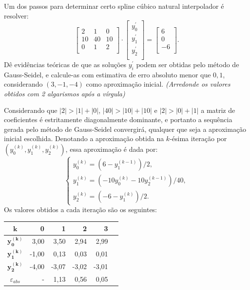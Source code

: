\documentclass[12pt,a4paper]{article}
\begin{document}
\begin{ExerciseList}
\Exercise[title={2,0}] Um dos passos para determinar certo spline cúbico natural interpolador é resolver:
\[
  \begin{bmatrix}
    2 & 1 & 0 \\
    10 & 40 & 10 \\
    0 & 1 & 2\\
  \end{bmatrix}
  \cdot
  \begin{bmatrix}
    y_0^\prime\\
    y_1^\prime\\
    y_2^\prime\\
  \end{bmatrix}
  =
  \begin{bmatrix}
    6\\
    0\\
    -6\\
  \end{bmatrix}.
\]
Dê evidências teóricas de que as soluções $y_i^\prime$ podem ser obtidas pelo método de Gauss-Seidel, e calcule-as com estimativa de erro absoluto menor que $0,1$, considerando $(3, -1,-4)$ como aproximação inicial.
{\color{blue} \textit{(Arredonde os valores obtidos com 2 algarismos após a vírgula)}}

\Answer Considerando que
$|2| > |1|+|0|$,
$|40| > |10|+|10|$ e
$|2| > |0|+|1|$
a matriz de coeficientes é estritamente diagonalmente dominante, e portanto a sequência gerada pelo método de Gauss-Seidel convergirá, qualquer que seja a aproximação inicial escolhida. Denotando a aproximação obtida na $k$-ésima iteração por $\left(y_0^{(k)}, y_1^{(k)}, y_2^{(k)}\right)$, essa aproximação é dada por:
\[
  \begin{cases}
    y_0^{(k)} = \left(6 - y_1^{(k-1)}\right)/2, \\
    y_1^{(k)} = \left(- 10 y_0^{(k)} - 10y_2^{(k-1)}\right)/40, \\
    y_2^{(k)} = \left(-6 - y_1^{(k)}\right)/2.
    \end{cases}
\]
Os valores obtidos a cada iteração são os seguintes:
\medskip
\begin{center}
\begin{tabular}{crrrrr}
\hline
$\boldsymbol{k}$     & 0 & 1 & 2 & 3\\
\hline
$\boldsymbol{y_0^{(k)}}$ &  3,00 &  3,50 &  2,94 &  2,99 \\
$\boldsymbol{y_1^{(k)}}$ & -1,00 &  0,13 &  0,03 &  0,01 \\
$\boldsymbol{y_2^{(k)}}$ & -4,00 & -3,07 & -3,02 & -3,01 \\
\hline
$\varepsilon_{abs}$ & - & 1,13 & 0,56 & 0,05\\
\hline
\end{tabular}
\end{center}



\end{ExerciseList}
\end{document}
